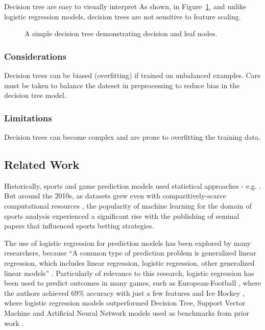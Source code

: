 \documentclass[12pt]{article}
\begin{document}
Decision tree are easy to visually interpret As shown, in Figure~\ref{fig:decision-tree}, and unlike logistic regression models, decision trees are not sensitive to feature scaling.

\begin{figure}[ht]
\centering
{}
\caption{A simple decision tree demonstrating decision and leaf nodes.}
\label{fig:decision-tree}
\end{figure}

\subsubsection{Considerations}Decision trees can be biased (overfitting) if trained on unbalanced examples. Care must be taken to balance the dateset in preprocessing to reduce bias in the decision tree model.

\subsubsection{Limitations}Decision trees can become complex and are prone to overfitting the training data.

\subsection{Related Work}
Historically, sports and game prediction models used statistical approaches - e.g. \cite{Clarke1995} \cite{Bailey2006}. But around the 2010s, as datasets grew even with comparitively-scarce computational resources \cite{Bottou2003}, the popularity of machine learning for the domain of sports analysis experienced a significant rise \cite{aiSports} with the publishing of seminal papers \cite{Constantinou2012} that influenced sports betting strategies.

The use of logistic regression for prediction models has been explored by many researchers, because ``A common type of prediction problem is generalized linear regression, which includes linear regression, logistic regression, other generalized linear models'' \cite{Gordon1999}. Particularly of relevance to this research, logistic regression has been used to predict outcomes in many games, such as European-Football \cite{Prasetio2016}, where the authors achieved 69\% accuracy with just a few features and Ice Hockey \cite{Chin2023}, where logistic regression models outperformed Decision Tree, Support Vector Machine and Artificial Neural Network models used as benchmarks from prior work \cite{Pischedda2014} \cite{Igiri2014}.
\end{document}
